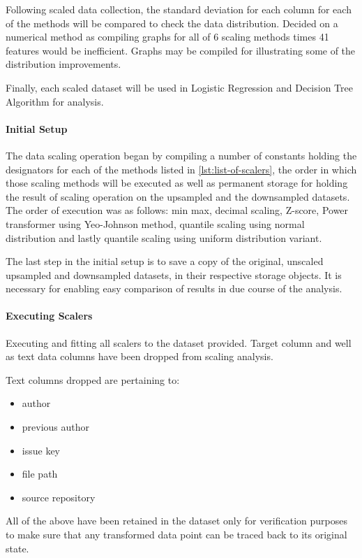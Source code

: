 Following scaled data collection, the standard deviation for each column for each of the methods will be compared to check the data distribution. Decided on a numerical method as compiling graphs for all of 6 scaling methods times 41 features would be inefficient. Graphs may be compiled for illustrating some of the distribution improvements.

Finally, each scaled dataset will be used in Logistic Regression and Decision Tree Algorithm for analysis.
\paragraph{Initial Setup}\label{sec:scalers:initial-setup}
The data scaling operation began by compiling a number of constants holding the designators for each of the methods listed in \ref{lst:list-of-scalers}, the order in which those scaling methods will be executed as well as permanent storage for holding the result of scaling operation on the upsampled and the downsampled datasets.
The order of execution was as follows: min max, decimal scaling, Z-score, Power transformer using Yeo-Johnson method, quantile scaling using normal distribution and lastly quantile scaling using uniform distribution variant.

The last step in the initial setup is to save a copy of the original, unscaled upsampled and downsampled datasets, in their respective storage objects. It is necessary for enabling easy comparison of results in due course of the analysis.

\paragraph{Executing Scalers}
Executing and fitting all scalers to the dataset provided. Target column and well as text data columns have been dropped from scaling analysis.

Text columns dropped are pertaining to:
\begin{itemize}
    \item author
    \item previous author
    \item issue key
    \item file path
    \item source repository
\end{itemize}

All of the above have been retained in the dataset only for verification purposes to make sure that any transformed data point can be traced back to its original state.

